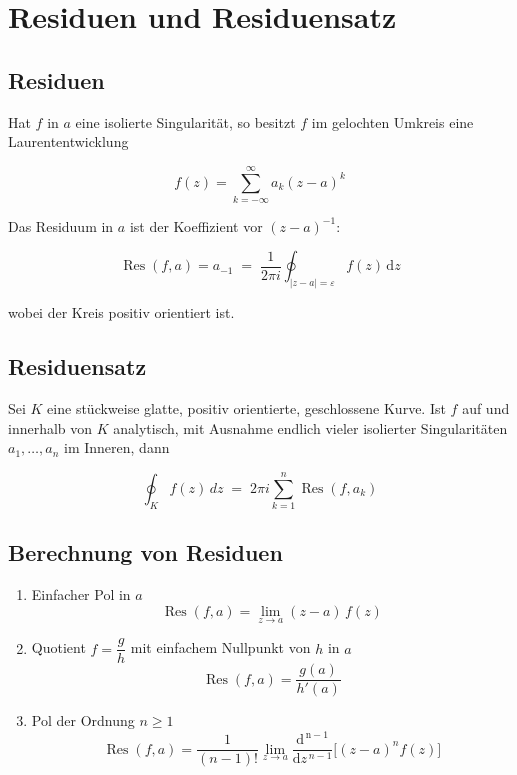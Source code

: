 \documentclass[a4paper,11pt,oneside,open=any,parskip=half, DIV=15]{scrreprt}
\begin{document}
\section{Residuen und Residuensatz}

   \subsection*{Residuen}

      Hat \(f\) in \(a\) eine isolierte Singularität, so besitzt \(f\) im gelochten
      Umkreis eine Laurententwicklung
      \begin{importantbox}
         \[
            f(z)=\sum_{k=-\infty}^{\infty} a_k (z-a)^k   %
         \]
      \end{importantbox}
      
      Das Residuum in \(a\) ist der Koeffizient vor \((z-a)^{-1}\):  %
      \begin{importantbox}
         \[
            \operatorname{Res}(f,a)=a_{-1} \;=\; \frac{1}{2\pi i}\oint_{|z-a|=\varepsilon} f(z)\,\mathrm{d}z
         \]
      \end{importantbox}
      wobei der Kreis positiv orientiert ist.

\newpage
   \subsection*{Residuensatz}
      Sei \(K\) eine stückweise glatte, positiv orientierte, geschlossene Kurve.
      Ist \(f\) auf und innerhalb von \(K\) analytisch, mit Ausnahme endlich vieler
      isolierter Singularitäten \(a_1,\dots,a_n\) im Inneren, dann
      \begin{importantbox}
         \[
            \oint_{K} f(z)\,dz
            \;=\; 2\pi i \sum_{k=1}^{n}\operatorname{Res}(f,a_k)
         \]      
      \end{importantbox}   

      \subsection*{Berechnung von Residuen}
         \begin{enumerate}
            \item Einfacher Pol in \(a\)
            \[
               \operatorname{Res}(f,a)=\lim_{z\to a}(z-a)\,f(z)
            \]
            \item Quotient \(f=\dfrac{g}{h}\) mit einfachem Nullpunkt von \(h\) in \(a\)
            \[
               \operatorname{Res}(f,a)=\frac{g(a)}{h'(a)}
            \]
            \item Pol der Ordnung \(n\ge 1\)
            \[
               \operatorname{Res}(f,a)=\frac{1}{(n-1)!}
               \lim_{z\to a}\frac{\mathrm{d^{\,n-1}}}{\mathrm{d}z^{\,n-1}} \big[(z-a)^n f(z)\big]  %
            \]
         \end{enumerate}
\end{document}
